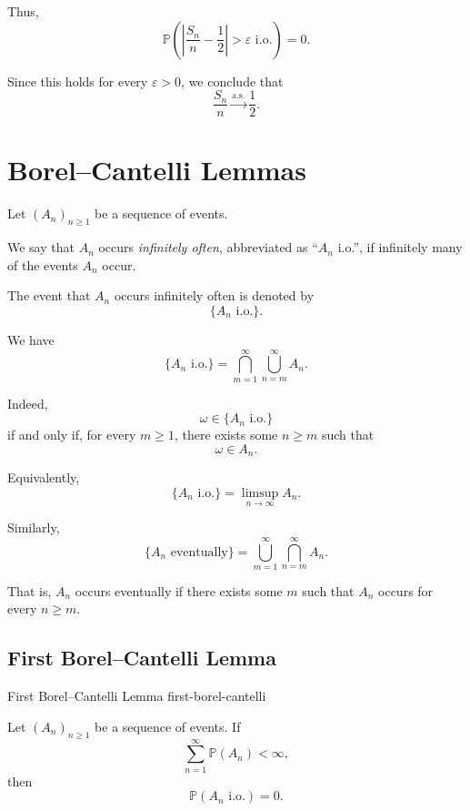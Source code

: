Thus,
\[
\boxed{
\mathbb{P}
\left(
\left|
\frac{S_n}{n}-\frac12
\right|>\varepsilon
\text{ i.o.}
\right)=0.
}
\]

Since this holds for every $\varepsilon>0$, we conclude that
\[
\boxed{
\frac{S_n}{n}
\xrightarrow{\mathrm{a.s.}}
\frac12.
}
\]



\section{Borel--Cantelli Lemmas}

Let $(A_n)_{n\geq1}$ be a sequence of events.

We say that $A_n$ occurs \emph{infinitely often}, abbreviated as
``$A_n$ i.o.'', if infinitely many of the events $A_n$ occur.

The event that $A_n$ occurs infinitely often is denoted by
\[
\{A_n\text{ i.o.}\}.
\]

We have
\[
\boxed{
\{A_n\text{ i.o.}\}
=
\bigcap_{m=1}^{\infty}
\bigcup_{n=m}^{\infty}A_n.
}
\]

Indeed,
\[
\omega\in\{A_n\text{ i.o.}\}
\]
if and only if, for every $m\geq1$, there exists some $n\geq m$
such that
\[
\omega\in A_n.
\]

Equivalently,
\[
\{A_n\text{ i.o.}\}
=
\limsup_{n\to\infty}A_n.
\]

Similarly,
\[
\boxed{
\{A_n\text{ eventually}\}
=
\bigcup_{m=1}^{\infty}
\bigcap_{n=m}^{\infty}A_n.
}
\]

That is, $A_n$ occurs eventually if there exists some $m$ such that
$A_n$ occurs for every $n\geq m$.



\subsection{First Borel--Cantelli Lemma}

\begin{theorem}{First Borel--Cantelli Lemma}
{first-borel-cantelli}

Let $(A_n)_{n\geq1}$ be a sequence of events. If
\[
\sum_{n=1}^{\infty}\mathbb{P}(A_n)<\infty,
\]
then
\[
\boxed{
\mathbb{P}(A_n\text{ i.o.})=0.
}
\]

\end{theorem}


